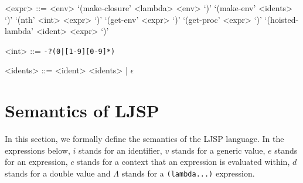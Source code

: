 \documentclass[11pt]{report}
\begin{document}
\begin{grammar}
<expr> ::= <env>
\alt `(make-closure' <lambda> <env> `)'
\alt `(make-env' <idents> `)'
\alt `(nth' <int> <expr> `)'
\alt `(get-env' <expr> `)'
\alt `(get-proc' <expr> `)'
\alt `(hoisted-lambda' <ident> <expr> `)'

<int> ::= \texttt{-?(0|[1-9][0-9]*)}

<idents> ::= <ident> <idents> | $\epsilon$
\end{grammar}


\section{Semantics of LJSP}
In this section, we formally define the semantics of the LJSP language. In the expressions below, $i$ stands for an identifier, $v$ stands for a generic value, $e$ stands for an expression, $c$ stands for a context that an expression is evaluated within, $d$ stands for a double value and $\Lambda$ stands for a \texttt{(lambda...)} expression.
\end{document}

